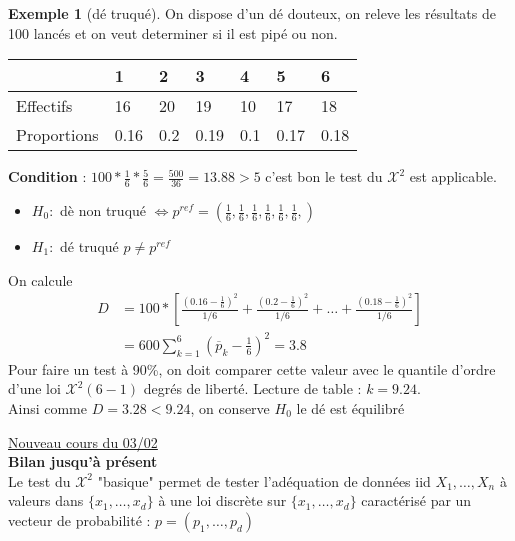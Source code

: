 \documentclass{article}
\theoremstyle{plain}%
\theoremstyle{definition}
\newtheorem{exmp}{Exemple}[section]
\theoremstyle{remark}
\begin{document}
\begin{exmp}[dé truqué]
    On dispose d'un dé douteux, on releve les résultats de 100 lancés et on veut determiner si il est pipé ou non.
    \begin{table}[!h]
        \centering
        \begin{tabular}{|l|l|l|l|l|l|l|}
        \hline
            ~ & 1 & 2 & 3 & 4 & 5 & 6 \\ \hline
            Effectifs & 16 & 20 & 19 & 10 & 17 & 18 \\ \hline
            Proportions & 0.16 & 0.2 & 0.19 & 0.1 & 0.17 & 0.18 \\ \hline
        \end{tabular}
    \end{table}

    \textbf{Condition} : $ 100*\frac{1}{6}*\frac{5}{6} = \frac{500}{36} = 13.88 > 5 $ c'est bon le test du $ \mathcal{X}^2 $ est applicable.
    \begin{itemize}
        \item $ H_0: $ dè non truqué $ \Leftrightarrow p^{ref} =  (\frac{1}{6},\frac{1}{6},\frac{1}{6},\frac{1}{6},\frac{1}{6},\frac{1}{6},) $
        \item $ H_1: $  dé truqué $ p \neq p^{ref} $ 
    \end{itemize}
    On calcule 
    \begin{align*}
        D &= 100 * [\frac{(0.16 - \frac{1}{6})^2}{1/6} + \frac{(0.2 - \frac{1}{6})^2}{1/6} + \dots + \frac{(0.18 - \frac{1}{6})^2}{1/6}] \\
            &= 600 \sum_{k=1}^{6}(\overline{p}_k - \frac{1}{6})^2 = 3.8
    \end{align*}
    Pour faire un test à 90\%, on doit comparer cette valeur avec le quantile d'ordre d'une loi $ \mathcal{X}^2 (6-1) $ degrés de liberté. Lecture de table : $ k= 9.24 $.\\
    Ainsi comme $ D=3.28 < 9.24 $, on conserve $ H_0 $ le dé est équilibré
\end{exmp}

\underline{Nouveau cours du 03/02} \\

\textbf{Bilan jusqu'à présent} \\
Le test du $ \mathcal{X}^2 $ "basique" permet de tester l'adéquation de données iid $ X_1, \dots, X_n $ à valeurs dans $ \{x_1, \dots, x_d\} $ à une loi discrète sur $\{x_1, \dots, x_d\}$ caractérisé par un vecteur de probabilité : $ p=(p_1, \dots, p_d) $ 
\end{document}
